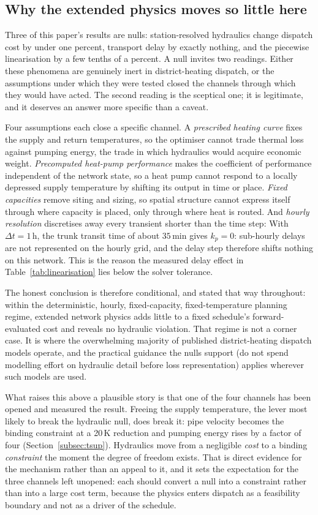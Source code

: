
\subsection{Why the extended physics moves so little here}
\label{subsec:whynull}

Three of this paper's results are nulls: station-resolved hydraulics change dispatch cost
by under one percent, transport delay by exactly nothing, and the piecewise linearisation
by a few tenths of a percent. A null invites two readings. Either these phenomena are
genuinely inert in district-heating dispatch, or the assumptions under which they were tested
closed the channels through which they would have acted. The second reading is the
sceptical one; it is legitimate, and it deserves an answer more specific than a caveat.

Four assumptions each close a specific channel. A \emph{prescribed heating curve} fixes the
supply and return temperatures, so the optimiser cannot trade thermal loss against pumping
energy, the trade in which hydraulics would acquire economic weight. \emph{Precomputed
heat-pump performance} makes the coefficient of performance independent of the network
state, so a heat pump cannot respond to a locally depressed supply temperature by shifting
its output in time or place. \emph{Fixed capacities} remove siting and sizing, so spatial
structure cannot express itself through where capacity is placed, only through where heat
is routed. And \emph{hourly resolution} discretises away every transient shorter than the
time step: With $\Delta t = 1$\,h, the trunk transit time of about $35$\,min gives $k_p = 0$: sub-hourly
delays are not represented on the hourly grid, and the delay step therefore shifts nothing on
this network. This is the reason the measured delay effect in
Table~\ref{tab:linearisation} lies below the solver tolerance.

The honest conclusion is therefore conditional, and stated that way throughout: within
the deterministic, hourly, fixed-capacity, fixed-temperature planning regime, extended
network physics adds little to a fixed schedule's forward-evaluated cost and reveals no
hydraulic violation. That regime is not a corner case. It is
where the overwhelming majority of published district-heating dispatch models operate, and
the practical guidance the nulls support (do not spend modelling effort on hydraulic
detail before loss representation) applies wherever such models are used.

What raises this above a plausible story is that one of the four channels has been opened
and measured the result. Freeing the supply temperature, the lever most likely to break the
hydraulic null, does break it: pipe velocity becomes the binding constraint at a 20\,K
reduction and pumping energy rises by a factor of four
(Section~\ref{subsec:tsup}). Hydraulics move from a negligible \emph{cost} to a binding
\emph{constraint} the moment the degree of freedom exists. That is direct evidence for the
mechanism rather than an appeal to it, and it sets the expectation for the three channels
left unopened: each should convert a null into a constraint rather than into a large cost
term, because the physics enters dispatch as a feasibility boundary and not as a driver of
the schedule.

